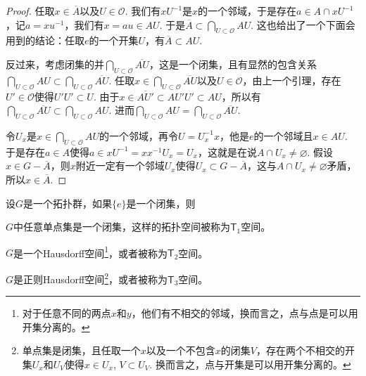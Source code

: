 \begin{proof}
	任取$x\in \overline{A}$以及$U\in \mathscr{O}$. 我们有$xU^{-1}$是$x$的一个邻域，于是存在$a\in A\cap x U^{-1}$，记$a=xu^{-1}$，我们有$x=au\in AU$. 于是$\overline{A}\subset \bigcap_{U\subset \mathscr{O}}AU$. 这也给出了一个下面会用到的结论：任取$e$的一个开集$U$，有$\overline{A}\subset AU$.

	反过来，考虑闭集的并$\bigcap_{U\subset \mathscr{O}}\overline{AU}$，这是一个闭集，且有显然的包含关系$\bigcap_{U\subset \mathscr{O}}AU\subset \bigcap_{U\subset \mathscr{O}}\overline{AU}$. 任取$x\in \bigcap_{U\subset \mathscr{O}}\overline{AU}$以及$U\in \mathscr{O}$，由上一个引理，存在$U'\in \mathscr{O}$使得$U'U'\subset U$. 由于$x\in \overline{AU'}\subset AU'U'\subset AU$，所以有$\bigcap_{U\subset \mathscr{O}}\overline{AU}\subset \bigcap_{U\subset \mathscr{O}}AU$. 进而$\bigcap_{U\subset \mathscr{O}}AU=\bigcap_{U\subset \mathscr{O}}\overline{AU}$.

	令$U_x$是$x\in \bigcap_{U\subset \mathscr{O}}AU$的一个邻域，再令$U=U_x^{-1}x$，他是$e$的一个邻域且$x\in AU$. 于是存在$a\in A$使得$a\in xU^{-1}=xx^{-1}U_x=U_x$，这就是在说$A\cap U_x\neq \varnothing$. 假设$x\in G-\overline{A}$，则$x$附近一定有一个邻域$U_x$使得$U_x\subset G-\overline{A}$，这与$A\cap U_x\neq \varnothing$矛盾，所以$x\in \overline{A}$.
\end{proof}



\begin{pro}\label{pro:3}
设$G$是一个拓扑群，如果$\{e\}$是一个闭集，则

\begin{compactenum}
\item $G$中任意单点集是一个闭集，这样的拓扑空间被称为$\mathsf{T}_1$空间。

\item $G$是一个Hausdorff空间\footnote{对于任意不同的两点$x$和$y$，他们有不相交的邻域，换而言之，点与点是可以用开集分离的。}，或者被称为$\mathsf{T}_2$空间。

\item $G$是正则Hausdorff空间\footnote{单点集是闭集，且任取一个$x$以及一个不包含$x$的闭集$V$，存在两个不相交的开集$U_x$和$U_V$使得$x\in U_x$, $V\subset U_V$. 换而言之，点与开集是可以用开集分离的。}，或者被称为$\mathsf{T}_3$空间。
\end{compactenum}
\end{pro}

